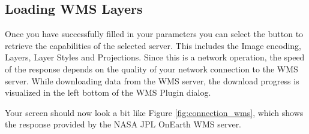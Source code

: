 
\subsection{Loading WMS Layers}\label{sec:ogc-wms-layers}

Once you have successfully filled in your parameters you can select the
button to retrieve the capabilities of the selected server.  This includes the Image encoding,
Layers, Layer Styles and Projections.  Since this
is a network operation, the speed of the response depends on the quality of your network
connection to the WMS server. While downloading data from the WMS server, the download progress 
is visualized in the left bottom of the WMS Plugin dialog. 

Your screen should now look a bit like Figure \ref{fig:connection_wms}, which shows the 
response provided by the NASA JPL OnEarth WMS server.

